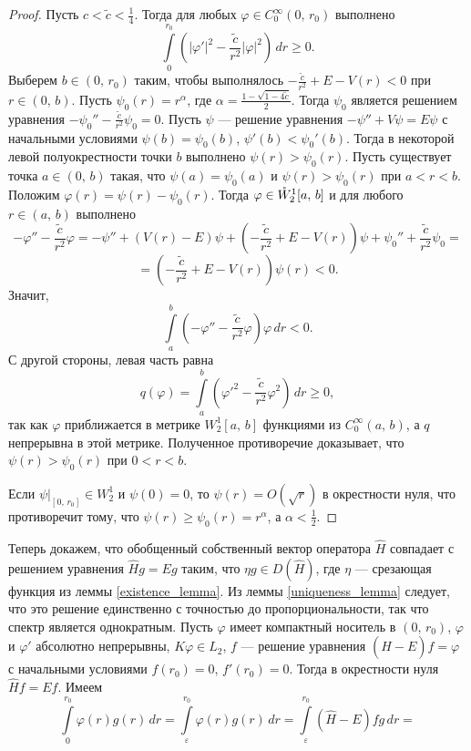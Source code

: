\documentclass[a4paper
]{article}
\begin{document}
\begin{proof}
Пусть $c<\tilde c<\frac14$. Тогда для любых $\varphi\in
C_0^\infty(0, \, r_0)$ выполнено $$\int \limits_0^{r_0}\left(
|\varphi'|^2-\frac{\tilde c}{r^2}|\varphi|^2\right)\, dr\ge 0.$$
Выберем $b\in (0, \, r_0)$ таким, чтобы выполнялось $-\frac{\tilde c}{r^2}+
E-V(r)<0$ при $r\in (0, \, b)$. Пусть $\psi_0(r)=r^{\alpha}$, где
$\alpha=\frac{1-\sqrt{1-4\tilde c}}{2}$. Тогда $\psi_0$ является решением
уравнения $-\psi_0''-\frac{\tilde c}{r^2}\psi_0=0$. Пусть $\psi$ ---
решение уравнения $-\psi''+V\psi=E\psi$ с начальными условиями
$\psi(b)=\psi_0(b)$, $\psi'(b)<\psi_0'(b)$. Тогда в некоторой левой
полуокрестности точки $b$ выполнено $\psi(r)>\psi_0(r)$. Пусть
существует точка $a\in (0, \, b)$ такая, что $\psi(a)=\psi_0(a)$ и
$\psi(r)>\psi_0(r)$ при $a<r<b$. Положим $\varphi(r)=\psi(r)-\psi_0(r)$.
Тогда $\varphi\in \mathaccent'27 W^1_2[a, \, b]$ и для любого $r\in
(a, \, b)$ выполнено $$-\varphi''-\frac{\tilde c}{r^2}\varphi
=-\psi''+(V(r)-E)\psi+\left(-\frac{\tilde c}{r^2}+E-V(r)\right)\psi
+\psi_0''+\frac{\tilde c}{r^2}\psi_0=$$ $$=\left(-\frac{\tilde c}{r^2}
+E-V(r)\right)\psi(r)<0.$$ Значит, $$\int \limits_a^b \left(-\varphi''
-\frac{\tilde c}{r^2}\varphi\right)\varphi\, dr<0.$$ С другой
стороны, левая часть равна $$q(\varphi)=\int \limits_a^b\left(\varphi'^2
-\frac{\tilde c}{r^2}\varphi^2\right)\, dr\ge 0,$$ так как
$\varphi$ приближается в метрике $W^1_2[a, \, b]$ функциями из $C_0^\infty
(a, \, b)$, а $q$ непрерывна в этой метрике. Полученное противоречие
доказывает, что $\psi(r)>\psi_0(r)$ при $0<r<b$. \par
Если $\psi|_{[0, \, r_0]}\in W^1_2$ и $\psi(0)=0$, то $\psi(r)=
O(\sqrt{r})$ в окрестности нуля, что противоречит тому, что $\psi(r)
\ge \psi_0(r)=r^\alpha$, а $\alpha<\frac12$.
\end{proof}
Теперь докажем, что обобщенный собственный вектор оператора $\hat H$
совпадает с решением уравнения $\hat Hg=Eg$ таким, что $\eta g\in
D(\hat H)$, где $\eta$ --- срезающая функция из леммы \ref{existence_lemma}.
Из леммы \ref{uniqueness_lemma} следует, что это решение единственно
с точностью до пропорциональности, так что спектр является однократным.
Пусть $\varphi$ имеет компактный носитель в $(0, \, r_0)$, $\varphi$
и $\varphi'$ абсолютно непрерывны, $K\varphi\in L_2$, $f$ --- решение уравнения
$(\hat H-E)f=\varphi$ с начальными условиями $f(r_0)=0$, $f'(r_0)=0$.
Тогда в окрестности нуля $\hat Hf=Ef$. Имеем
$$\int \limits_0^{r_0}\varphi(r)g(r)\, dr=\int \limits_\varepsilon^{r_0}
\varphi(r)g(r)\, dr=\int \limits_\varepsilon^{r_0}(\hat H-E)fg\, dr=$$
\end{document}
